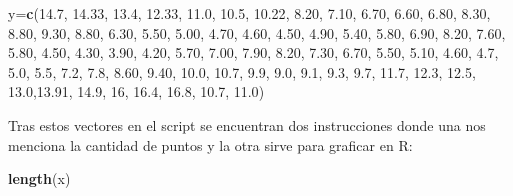 \documentclass[]{article}
\newenvironment{Shaded}{\begin{snugshade}}{\end{snugshade}}
\newcommand{\KeywordTok}[1]{\textcolor[rgb]{0.13,0.29,0.53}{\textbf{#1}}}
\newcommand{\DecValTok}[1]{\textcolor[rgb]{0.00,0.00,0.81}{#1}}
\newcommand{\FloatTok}[1]{\textcolor[rgb]{0.00,0.00,0.81}{#1}}
\newcommand{\NormalTok}[1]{#1}
\begin{document}
\begin{Shaded}
\begin{Highlighting}[]
\NormalTok{y=}\KeywordTok{c}\NormalTok{(}\FloatTok{14.7}\NormalTok{, }\FloatTok{14.33}\NormalTok{, }\FloatTok{13.4}\NormalTok{, }\FloatTok{12.33}\NormalTok{, }\FloatTok{11.0}\NormalTok{, }\FloatTok{10.5}\NormalTok{, }\FloatTok{10.22}\NormalTok{, }\FloatTok{8.20}\NormalTok{, }\FloatTok{7.10}\NormalTok{, }\FloatTok{6.70}\NormalTok{, }\FloatTok{6.60}\NormalTok{, }\FloatTok{6.80}\NormalTok{, }\FloatTok{8.30}\NormalTok{, }\FloatTok{8.80}\NormalTok{, }\FloatTok{9.30}\NormalTok{, }\FloatTok{8.80}\NormalTok{, }\FloatTok{6.30}\NormalTok{, }\FloatTok{5.50}\NormalTok{, }\FloatTok{5.00}\NormalTok{, }\FloatTok{4.70}\NormalTok{, }\FloatTok{4.60}\NormalTok{, }\FloatTok{4.50}\NormalTok{, }\FloatTok{4.90}\NormalTok{, }\FloatTok{5.40}\NormalTok{, }\FloatTok{5.80}\NormalTok{, }\FloatTok{6.90}\NormalTok{, }\FloatTok{8.20}\NormalTok{, }\FloatTok{7.60}\NormalTok{, }\FloatTok{5.80}\NormalTok{, }\FloatTok{4.50}\NormalTok{, }\FloatTok{4.30}\NormalTok{, }\FloatTok{3.90}\NormalTok{, }\FloatTok{4.20}\NormalTok{, }\FloatTok{5.70}\NormalTok{, }\FloatTok{7.00}\NormalTok{, }\FloatTok{7.90}\NormalTok{, }\FloatTok{8.20}\NormalTok{, }\FloatTok{7.30}\NormalTok{, }\FloatTok{6.70}\NormalTok{, }\FloatTok{5.50}\NormalTok{, }\FloatTok{5.10}\NormalTok{, }\FloatTok{4.60}\NormalTok{, }\FloatTok{4.7}\NormalTok{, }\FloatTok{5.0}\NormalTok{, }\FloatTok{5.5}\NormalTok{, }\FloatTok{7.2}\NormalTok{, }\FloatTok{7.8}\NormalTok{, }\FloatTok{8.60}\NormalTok{, }\FloatTok{9.40}\NormalTok{, }\FloatTok{10.0}\NormalTok{, }\FloatTok{10.7}\NormalTok{, }\FloatTok{9.9}\NormalTok{, }\FloatTok{9.0}\NormalTok{, }\FloatTok{9.1}\NormalTok{, }\FloatTok{9.3}\NormalTok{, }\FloatTok{9.7}\NormalTok{, }\FloatTok{11.7}\NormalTok{, }\FloatTok{12.3}\NormalTok{, }\FloatTok{12.5}\NormalTok{, }\FloatTok{13.0}\NormalTok{,}\FloatTok{13.91}\NormalTok{, }\FloatTok{14.9}\NormalTok{, }\DecValTok{16}\NormalTok{, }\FloatTok{16.4}\NormalTok{, }\FloatTok{16.8}\NormalTok{, }\FloatTok{10.7}\NormalTok{, }\FloatTok{11.0}\NormalTok{)}
\end{Highlighting}
\end{Shaded}

Tras estos vectores en el script se encuentran dos instrucciones donde
una nos menciona la cantidad de puntos y la otra sirve para graficar en
R:

\begin{Shaded}
\begin{Highlighting}[]
\KeywordTok{length}\NormalTok{(x)}
\end{Highlighting}
\end{Shaded}
\end{document}
